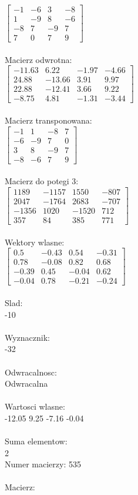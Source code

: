 \documentclass[a4paper,12pt]{article}
\begin{document}
$\begin{bmatrix} -1&-6&3&-8\\1&-9&8&-6\\-8&7&-9&7\\7&0&7&9 \end{bmatrix}$
\\
\\
Macierz odwrotna:\\

$\begin{bmatrix} -11.63&6.22&-1.97&-4.66\\24.88&-13.66&3.91&9.97\\22.88&-12.41&3.66&9.22\\-8.75&4.81&-1.31&-3.44 \end{bmatrix}$
\\
\\
Macierz transponowana:\\

$\begin{bmatrix} -1&1&-8&7\\-6&-9&7&0\\3&8&-9&7\\-8&-6&7&9 \end{bmatrix}$
\\
\\
Macierz do potegi 3:\\

$\begin{bmatrix} 1189&-1157&1550&-807\\2047&-1764&2683&-707\\-1356&1020&-1520&712\\357&84&385&771 \end{bmatrix}$
\\
\\
Wektory wlasne:\\

$\begin{bmatrix} 0.5&-0.43&0.54&-0.31\\0.78&-0.08&0.82&0.68\\-0.39&0.45&-0.04&0.62\\-0.04&0.78&-0.21&-0.24 \end{bmatrix}$
\\
\\
Slad:\\
-10
\\
\\
Wyznacznik:\\
-32
\\
\\
Odwracalnosc:\\
Odwracalna
\\
\\
Wartosci wlasne:\\
-12.05 9.25 -7.16 -0.04
\\
\\
Suma elementow:\\
2
\\
\newpage
Numer macierzy:
535
\\
\\
Macierz:\\
\end{document}
